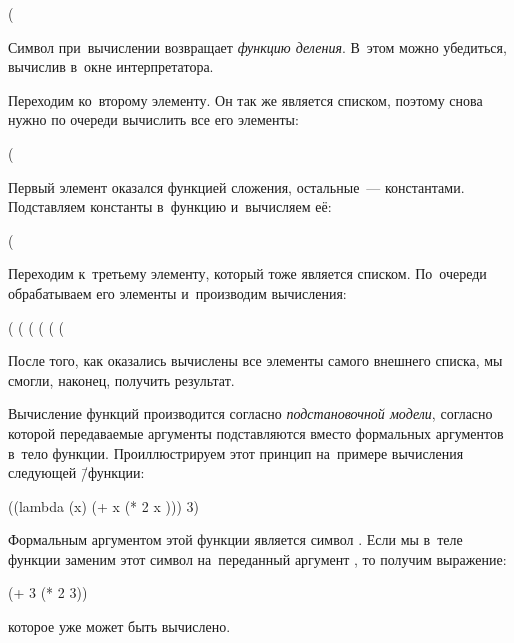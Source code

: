 \begin{SchemeCode}
(%
\end{SchemeCode}
Символ \s{/} при~вычислении возвращает \emph{функцию деления}. В~этом можно убедиться, вычислив \s{/} в~окне интерпретатора.

Переходим ко~второму элементу. Он так же является списком, поэтому снова нужно по очереди вычислить все его элементы:
\begin{SchemeCode}
(%
\end{SchemeCode}
Первый элемент оказался функцией сложения, остальные~---  константами. Подставляем константы в~функцию и~вычисляем её:

\begin{SchemeCode}
(%
\end{SchemeCode}

Переходим к~третьему элементу, который тоже является списком. По~очереди обрабатываем его элементы и~производим вычисления:

\begin{SchemeCode}
(%
(%
(%
(%
(%
(%
\end{SchemeCode}

После того, как оказались вычислены все элементы самого внешнего списка, мы смогли, наконец, получить результат.

Вычисление функций производится согласно \emph{подстановочной модели}, согласно которой передаваемые аргументы подставляются вместо формальных аргументов в~тело функции. Проиллюстрируем этот принцип на~примере вычисления следующей \=/функции:
\begin{SchemeCode}[emph=x]
((lambda (x) (+ x (* 2 x ))) 3)
\end{SchemeCode}
Формальным аргументом этой функции является символ . Если мы в~теле функции заменим этот символ на~переданный аргумент , то получим выражение:
\begin{SchemeCode}
(+ 3  (* 2 3))
\end{SchemeCode}
которое уже может быть вычислено.

